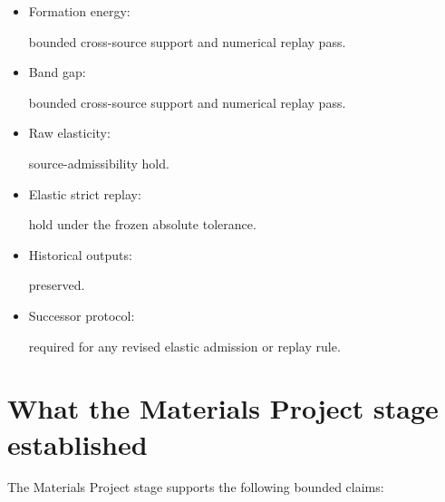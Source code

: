 \documentclass[11pt,a4paper,oneside]{report}
\begin{document}
\begin{evidencebox}



\begin{itemize}



\item

Formation energy:

bounded cross-source support and numerical replay pass.



\item

Band gap:

bounded cross-source support and numerical replay pass.



\item

Raw elasticity:

source-admissibility hold.



\item

Elastic strict replay:

hold under the frozen absolute tolerance.



\item

Historical outputs:

preserved.



\item

Successor protocol:

required for any revised elastic admission or replay rule.



\end{itemize}



\end{evidencebox}





\section{What the Materials Project stage established}



The Materials Project stage supports the following bounded claims:
\end{document}
